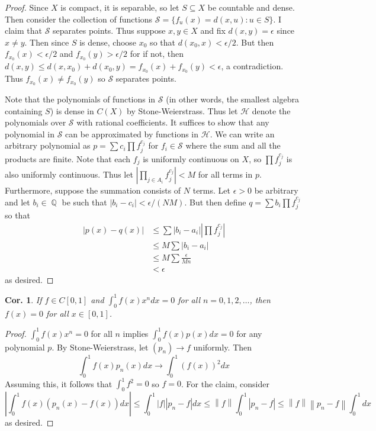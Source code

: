 \documentclass[12pt, a4paper]{book}
\DeclareMathOperator{\Q}{\mathbb{Q}}
\newcommand{\norm}[1]{\left\lVert#1\right\rVert} %
\newtheorem{corollary}[theorem]{Cor.}
\theoremstyle{nonumberplain}
\newtheorem{proof}{Proof}
\begin{document}
\begin{proof}
    Since $X$ is compact, it is separable, so let $S\subseteq X$ be countable and dense.
    Then consider the collection of functions $\mathcal{S}=\{f_u(x)=d(x,u):u\in S\}$.
    I claim that $\mathcal{S}$ separates points.
    Thus suppose $x,y\in X$ and fix $d(x,y)=\epsilon$ since $x\neq y$.
    Then since $S$ is dense, choose $x_0$ so that $d(x_0,x)<\epsilon/2$.
    But then $f_{x_0}(x)<\epsilon/2$ and $f_{x_0}(y)>\epsilon/2$ for if not, then $d(x,y)\leq d(x,x_0)+d(x_0,y)=f_{x_0}(x)+f_{x_0}(y)<\epsilon$, a contradiction.
    Thus $f_{x_0}(x)\neq f_{x_0}(y)$ so $\mathcal{S}$ separates points.

    Note that the polynomials of functions in $\mathcal{S}$ (in other words, the smallest algebra containing $S$) is dense in $C(X)$ by Stone-Weierstrass.
    Thus let $\mathcal{H}$ denote the polynomials over $\mathcal{S}$ with rational coefficients.
    It suffices to show that any polynomial in $\mathcal{S}$ can be approximated by functions in $\mathcal{H}$.
    We can write an arbitrary polynomial as $p=\sum c_i \prod f_j^{c_j}$ for $f_i\in\mathcal{S}$ where the sum and all the products are finite.
    Note that each $f_j$ is uniformly continuous on $X$, so $\prod f_j^{c_j}$ is also uniformly continuous.
    Thus let $\left\lvert\prod_{j\in A_i} f_j^{c_j}\right\rvert<M$ for all terms in $p$.
    Furthermore, suppose the summation consists of $N$ terms.
    Let $\epsilon>0$ be arbitrary and let $b_i\in\Q$ be such that $|b_i-c_i|<\epsilon/(NM)$.
    But then define $q=\sum b_i\prod f_j^{c_j}$ so that
    \begin{align*}
        |p(x)-q(x)|&\leq\sum |b_i-a_i|\left\lvert\prod f_j^{c_j}\right\rvert\\
                   &\leq M\sum|b_i-a_i|\\
                   &\leq M\sum \frac{\epsilon}{Mn}\\
                   &<\epsilon
    \end{align*}
    as desired.
\end{proof}
\begin{corollary}
    If $f\in C[0,1]$ and $\int_0^1 f(x)x^n dx = 0$ for all $n=0,1,2,\ldots$, then $f(x)=0$ for all $x\in[0,1]$.
\end{corollary}
\begin{proof}
    $\int_0^1 f(x)x^n=0$ for all $n$ implies $\int_0^1 f(x)p(x)dx=0$ for any polynomial $p$.
    By Stone-Weierstrass, let $(p_n)\to f$ uniformly.
    Then
    \[\int_0^1f(x)p_n(x)dx\to\int_0^1 (f(x))^2dx\]
    Assuming this, it follows that $\int_0^1 f^2=0$ so $f=0$.
    For the claim, consider
    \[|\int_0^1 f(x)(p_n(x)-f(x))dx|\leq\int_0^1|f||p_n-f|dx\leq\norm{f}\int_0^1|p_n-f|\leq\norm{f}\norm{p_n-f}\int_0^1 dx\]
    as desired.
\end{proof}
\end{document}
